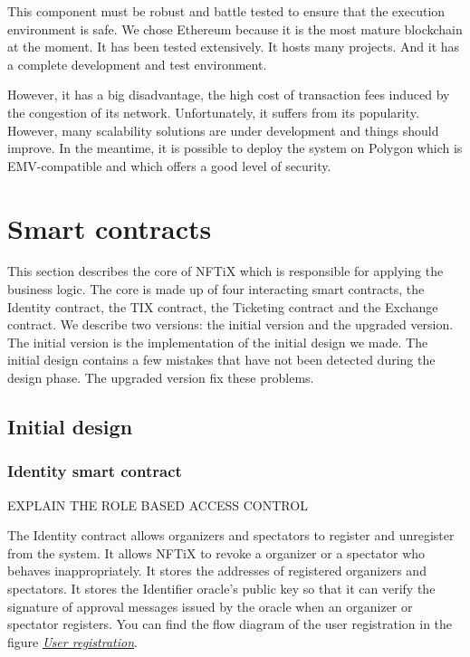 \documentclass[a4paper,11pt,oneside]{report}
\begin{document}
This component must be robust and battle tested to ensure that the execution environment is safe. We chose Ethereum because it is the most mature blockchain at the moment. It has been tested extensively. It hosts many projects. And it has a complete development and test environment.

However, it has a big disadvantage, the high cost of transaction fees induced by the congestion of its network. Unfortunately, it suffers from its popularity. However, many scalability solutions are under development and things should improve. In the meantime, it is possible to deploy the system on Polygon which is EMV-compatible and which offers a good level of security.

\section{Smart contracts}
This section describes the core of NFTiX which is responsible for applying the business logic. The core is made up of four interacting smart contracts, the Identity contract, the TIX contract, the Ticketing contract and the Exchange contract. We describe two versions: the initial version and the upgraded version. The initial version is the implementation of the initial design we made. The initial design contains a few mistakes that have not been detected during the design phase. The upgraded version fix these problems.

\subsection{Initial design}

\subsubsection{Identity smart contract}

EXPLAIN THE ROLE BASED ACCESS CONTROL

The Identity contract allows organizers and spectators to register and unregister from the system. It allows NFTiX to revoke a organizer or a spectator who behaves inappropriately. It stores the addresses of registered organizers and spectators. It stores the Identifier oracle's public key so that it can verify the signature of approval messages issued by the oracle when an organizer or spectator registers. You can find the flow diagram of the user registration in the figure  \hyperref[fig:user_registration]{ \textit{User registration}}.
\end{document}
